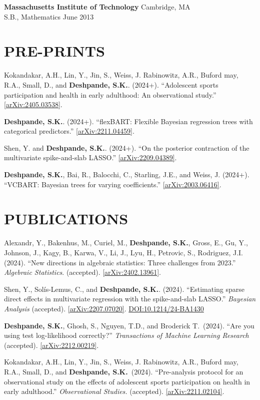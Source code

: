 \documentclass[margin]{res}
\def\skd{\textbf{Deshpande, S.K.}}
\begin{document}
\begin{resume}
                {\bf Massachusetts Institute of Technology} \hfill Cambridge, MA \\
                S.B., Mathematics \hfill June 2013 
  
  
\section{PRE-PRINTS}

Kokandakar, A.H., Lin, Y., Jin, S., Weiss, J. Rabinowitz, A.R., Buford may, R.A., Small, D., and \skd. (2024+). ``Adolescent sports participation and health in early adulthood: An observational study.'' \href{https://arxiv.org/abs/2405.03538}{[arXiv:2405.03538]}.

\skd. (2024+). ``flexBART: Flexible Bayesian regression trees with categorical predictors.'' \href{https://arxiv.org/abs/2211.04459}{[arXiv:2211.04459]}.

Shen, Y. and \skd. (2024+). ``On the posterior contraction of the multivariate spike-and-slab LASSO.'' \href{https://arxiv.org/abs/2209.04389}{[arXiv:2209.04389]}.

\skd, Bai, R., Balocchi, C., Starling, J.E., and Weiss, J. (2024+). ``VCBART: Bayesian trees for varying coefficients.'' \href{https://arxiv.org/abs/2003.06416}{[arXiv:2003.06416]}. 
\section{PUBLICATIONS}

Alexandr, Y., Bakenhus, M., Curiel, M., \skd, Gross, E., Gu, Y., Johnson, J., Kagy, B., Karwa, V., Li, J., Lyu, H., Petrovic, S., Rodriguez, J.I. (2024). ``New directions in algebraic statistics: Three challenges from 2023.'' \textit{Algebraic Statistics}. (accepted). \href{https://arxiv.org/abs/2402.13961}{[arXiv:2402.13961]}.

Shen, Y., Sol\'{i}s-Lemus, C., and \skd. (2024). ``Estimating sparse direct effects in multivariate regression with the spike-and-slab LASSO.'' \textit{Bayesian Analysis} (accepted). \href{https://arxiv.org/abs/2207.07020}{[arXiv:2207.07020]}. \href{https://doi.org/10.1214/24-BA1430}{DOI:10.1214/24-BA1430}

\skd, Ghosh, S., Nguyen, T.D., and Broderick T.~(2024). ``Are you using test log-likelihood correctly?'' \textit{Transactions of Machine Learning Research} (accepted). \href{https://arxiv.org/abs/2212.00219}{[arXiv:2212.00219]}.

Kokandakar, A.H., Lin, Y., Jin, S., Weiss, J. Rabinowitz, A.R., Buford may, R.A., Small, D., and \skd~(2024). ``Pre-analysis protocol for an observational study on the effects of adolescent sports participation on health in early adulthood.'' \textit{Observational Studies.} (accepted). \href{https://arxiv.org/abs/2211.02104}{[arXiv:2211.02104]}.


\end{resume}
\end{document}
